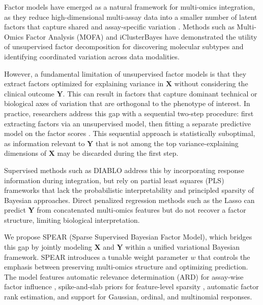 \documentclass[11pt]{article}
\begin{document}
Factor models have emerged as a natural framework for multi-omics integration, as they reduce high-dimensional multi-assay data into a smaller number of latent factors that capture shared and assay-specific variation \citep{lock2013joint, argelaguet2018multi}. Methods such as Multi-Omics Factor Analysis (MOFA) \citep{argelaguet2018multi} and iClusterBayes \citep{mo2018pattern} have demonstrated the utility of unsupervised factor decomposition for discovering molecular subtypes and identifying coordinated variation across data modalities.

However, a fundamental limitation of unsupervised factor models is that they extract factors optimized for explaining variance in $\mathbf{X}$ without considering the clinical outcome $\mathbf{Y}$. This can result in factors that capture dominant technical or biological axes of variation that are orthogonal to the phenotype of interest. In practice, researchers address this gap with a sequential two-step procedure: first extracting factors via an unsupervised model, then fitting a separate predictive model on the factor scores \citep{witten2009penalized}. This sequential approach is statistically suboptimal, as information relevant to $\mathbf{Y}$ that is not among the top variance-explaining dimensions of $\mathbf{X}$ may be discarded during the first step.

Supervised methods such as DIABLO \citep{singh2019diablo} address this by incorporating response information during integration, but rely on partial least squares (PLS) frameworks that lack the probabilistic interpretability and principled sparsity of Bayesian approaches. Direct penalized regression methods such as the Lasso \citep{tibshirani1996regression} can predict $\mathbf{Y}$ from concatenated multi-omics features but do not recover a factor structure, limiting biological interpretation.

We propose SPEAR (Sparse Supervised Bayesian Factor Model), which bridges this gap by jointly modeling $\mathbf{X}$ and $\mathbf{Y}$ within a unified variational Bayesian framework. SPEAR introduces a tunable weight parameter $w$ that controls the emphasis between preserving multi-omics structure and optimizing prediction. The model features automatic relevance determination (ARD) for assay-wise factor influence \citep{tipping2001sparse, mackay1992bayesian}, spike-and-slab priors for feature-level sparsity \citep{george1993variable, mitchell1988bayesian}, automatic factor rank estimation, and support for Gaussian, ordinal, and multinomial responses.
\end{document}
